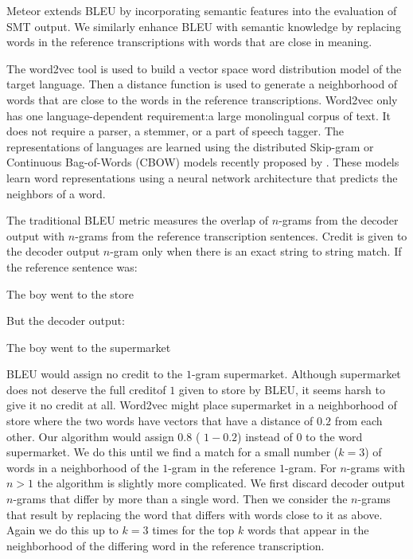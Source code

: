 Meteor extends BLEU by incorporating semantic features into the evaluation of SMT output. We similarly enhance BLEU with semantic knowledge by replacing words in the reference transcriptions with words that are close in meaning. 

The word2vec tool is used to build a vector space word distribution model of the target language. Then a distance function is used to generate a neighborhood of words that are close to the words in the reference transcriptions. Word2vec only has one language-dependent requirement:a large monolingual corpus of text. It does not require a parser, a stemmer, or a part of speech tagger.
The representations of languages are learned using the distributed Skip-gram or Continuous Bag-of-Words (CBOW) models recently proposed by . These models learn word representations using a neural network architecture that   predicts the neighbors of a word.

The traditional BLEU metric measures the overlap of $n$-grams from the decoder
output with $n$-grams from the reference transcription sentences.
Credit is given to the decoder output $n$-gram only when there is an exact
string to string match.
If the reference sentence was:

The boy went to the store

But the decoder output:

The boy went to the supermarket

BLEU would assign no credit to the $1$-gram supermarket.
Although supermarket does not deserve the full creditof $1$ given to store by
BLEU, it seems harsh to give it no credit at all.
Word2vec might place supermarket in a neighborhood of store where the two
words have vectors that have a distance of $0.2$ from each other.
Our algorithm would assign $0.8$ ( $1-0.2$) instead of $0$ to the word supermarket.
We do this until we find a match for a small number ($k=3$) of words in a
neighborhood of the $1$-gram in the reference $1$-gram.
For $n$-grams with $n>1$ the algorithm is slightly more complicated.
We first discard decoder output $n$-grams that differ by more than a single
word.
Then we consider the $n$-grams that result by replacing the word that differs
with words close to it as above. Again
we do this up to $k=3$ times for the top $k$ words that appear in the
neighborhood of the differing word in the reference transcription.
